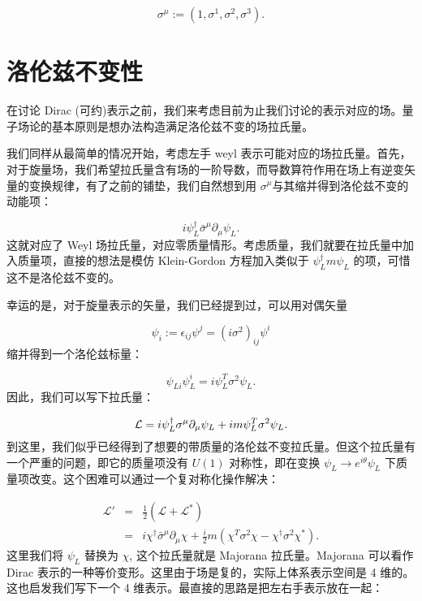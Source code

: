\documentclass[10pt,UTF8]{ctexart}
\begin{document}
\begin{equation}
\sigma^{\mu}:=\left(1,\sigma^{1},\sigma^{2},\sigma^{3}\right).
\end{equation}


\section*{洛伦兹不变性}
\noindent
在讨论 Dirac (可约)表示之前，我们来考虑目前为止我们讨论的表示对应的场。量子场论的基本原则是想办法构造满足洛伦兹不变的场拉氏量。

我们同样从最简单的情况开始，考虑左手 weyl 表示可能对应的场拉氏量。首先，对于旋量场，我们希望拉氏量含有场的一阶导数，而导数算符作用在场上有逆变矢量的变换规律，有了之前的铺垫，我们自然想到用
$\sigma^{\mu}$与其缩并得到洛伦兹不变的动能项：

\begin{equation}
i\psi_{L}^{\dagger}\bar{\sigma}^{\mu}\partial_{\mu}\psi_{L}.
\end{equation}
这就对应了 Weyl 场拉氏量，对应零质量情形。考虑质量，我们就要在拉氏量中加入质量项，直接的想法是模仿 Klein-Gordon
方程加入类似于 $\psi_{L}^{\dagger}m\psi_{L}$ 的项，可惜这不是洛伦兹不变的。

幸运的是，对于旋量表示的矢量，我们已经提到过，可以用对偶矢量

\begin{equation}
\psi_{i}:=\epsilon_{ij}\psi^{j}=\left(i\sigma^{2}\right)_{ij}\psi^{i}
\end{equation}
缩并得到一个洛伦兹标量：

\begin{equation}
\psi_{Li}\psi_{L}^{i}=i\psi_{L}^{T}\sigma^{2}\psi_{L}.
\end{equation}
因此，我们可以写下拉氏量：

\begin{equation}
{\cal L}=i\psi_{L}^{\dagger}\sigma^{\mu}\partial_{\mu}\psi_{L}+im\psi_{L}^{T}\sigma^{2}\psi_{L}.
\end{equation}
到这里，我们似乎已经得到了想要的带质量的洛伦兹不变拉氏量。但这个拉氏量有一个严重的问题，即它的质量项没有 $U(1)$ 对称性，即在变换
$\psi_{L}\rightarrow e^{i\theta}\psi_{L}$ 下质量项改变。这个困难可以通过一个复对称化操作解决：

\begin{eqnarray}
\mathcal{L}' & = & \frac{1}{2}\left(\mathcal{L}+\mathcal{L}^{*}\right)\nonumber \\
 & = & i\chi^{\dagger}\bar{\sigma}^{\mu}\partial_{\mu}\chi+\frac{i}{2}m\left(\chi^{T}\sigma^{2}\chi-\chi^{\dagger}\sigma^{2}\chi^{*}\right).
\end{eqnarray}
这里我们将 $\psi_{L}$ 替换为 $\chi$, 这个拉氏量就是 Majorana 拉氏量。Majorana 可以看作
Dirac 表示的一种等价变形。这里由于场是复的，实际上体系表示空间是 4 维的。这也启发我们写下一个 4 维表示。最直接的思路是把左右手表示放在一起：
\end{document}
